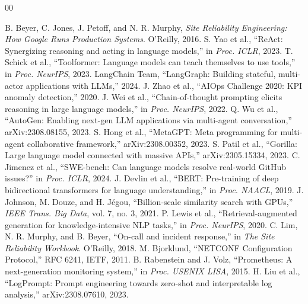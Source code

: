 \documentclass[10pt,conference]{IEEEtran}
\begin{document}
\begin{thebibliography}{00}
\footnotesize
\renewcommand{\baselinestretch}{0.83}\selectfont
\setlength{\itemsep}{0pt}\setlength{\parskip}{0pt}\setlength{\parsep}{0pt}

 B. Beyer, C. Jones, J. Petoff, and N. R. Murphy, \emph{Site Reliability Engineering: How Google Runs Production Systems}. O'Reilly, 2016.
 S. Yao et al., ``ReAct: Synergizing reasoning and acting in language models,'' in \emph{Proc. ICLR}, 2023.
 T. Schick et al., ``Toolformer: Language models can teach themselves to use tools,'' in \emph{Proc. NeurIPS}, 2023.
 LangChain Team, ``LangGraph: Building stateful, multi-actor applications with LLMs,'' 2024.
 J. Zhao et al., ``AIOps Challenge 2020: KPI anomaly detection,'' 2020.
 J. Wei et al., ``Chain-of-thought prompting elicits reasoning in large language models,'' in \emph{Proc. NeurIPS}, 2022.
 Q. Wu et al., ``AutoGen: Enabling next-gen LLM applications via multi-agent conversation,'' arXiv:2308.08155, 2023.
 S. Hong et al., ``MetaGPT: Meta programming for multi-agent collaborative framework,'' arXiv:2308.00352, 2023.
 S. Patil et al., ``Gorilla: Large language model connected with massive APIs,'' arXiv:2305.15334, 2023.
 C. Jimenez et al., ``SWE-bench: Can language models resolve real-world GitHub issues?'' in \emph{Proc. ICLR}, 2024.
 J. Devlin et al., ``BERT: Pre-training of deep bidirectional transformers for language understanding,'' in \emph{Proc. NAACL}, 2019.
 J. Johnson, M. Douze, and H. J\'egou, ``Billion-scale similarity search with GPUs,'' \emph{IEEE Trans. Big Data}, vol. 7, no. 3, 2021.
 P. Lewis et al., ``Retrieval-augmented generation for knowledge-intensive NLP tasks,'' in \emph{Proc. NeurIPS}, 2020.
 C. Lim, N. R. Murphy, and B. Beyer, ``On-call and incident response,'' in \emph{The Site Reliability Workbook}. O'Reilly, 2018.
 M. Bjorklund, ``NETCONF Configuration Protocol,'' RFC 6241, IETF, 2011.
 B. Rabenstein and J. Volz, ``Prometheus: A next-generation monitoring system,'' in \emph{Proc. USENIX LISA}, 2015.
 H. Liu et al., ``LogPrompt: Prompt engineering towards zero-shot and interpretable log analysis,'' arXiv:2308.07610, 2023.

\end{thebibliography}
\end{document}
